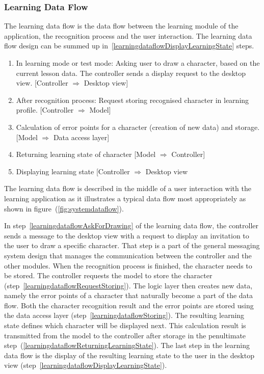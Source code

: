 \subsubsection{Learning Data Flow}
\label{sec:arch:learningdataflow}

The learning data flow is the data flow between the learning module of the 
application, the recognition process and the user interaction.
The learning data flow design can be summed up 
in~\ref{learningdataflowDisplayLearningState} steps.
\begin{enumerate}
  \item \label{learningdataflowAskForDrawing} 
        In learning mode or test mode: Asking user to draw a character,
        based on the current lesson data. The controller sends a display
        request to the desktop view.
        [Controller $\Rightarrow$ Desktop view]
  \item \label{learningdataflowRequestStoring} 
        After recognition process: Request storing recognised character in 
        learning profile.
        [Controller $\Rightarrow$ Model]
  \item \label{learningdataflowStoring} 
        Calculation of error points for a character (creation of new data) and
        storage.
        [Model $\Rightarrow$ Data access layer]
  \item \label{learningdataflowReturningLearningState} 
        Returning learning state of character 
        [Model $\Rightarrow$ Controller] 
  \item \label{learningdataflowDisplayLearningState} %
        Displaying learning state 
        [Controller $\Rightarrow$ Desktop view
\end{enumerate}
The learning data flow is described in the middle of a user interaction with the
learning application as it illustrates a typical data flow most appropriately
as shown in figure~(\ref{fig:systemdataflow}).

In step~\ref{learningdataflowAskForDrawing} of the learning data flow, the 
controller sends a message to the desktop view with a request to display an 
invitation to the user to draw a specific character.
That step is a part of the general messaging system design that manages the 
communication between the controller and the other modules.
When the recognition process is finished, the character needs to be stored.
The controller requests the model to store the 
character (step~\ref{learningdataflowRequestStoring}).
The logic layer then creates new data, namely the error points of a 
character that naturally become a part of the data flow.
Both the character recognition result and the error points are stored
using the data access layer (step~\ref{learningdataflowStoring}). 
The resulting learning state defines which character will be displayed next.
This calculation result is transmitted from the model to the 
controller after storage in the penultimate 
step~(\ref{learningdataflowReturningLearningState}).
The last step in the learning data flow is the display of the resulting learning 
state to the user in the desktop 
view (step~\ref{learningdataflowDisplayLearningState}).

